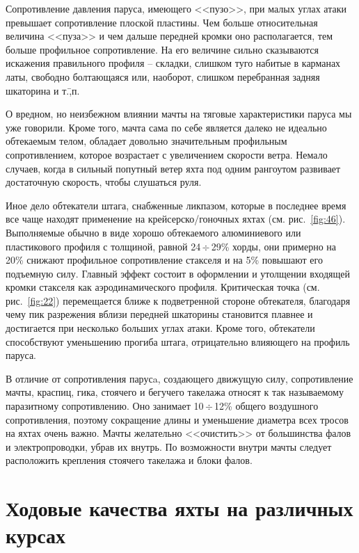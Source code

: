 \documentclass[a4paper, 12pt, twoside, final, book, russian, fittopage, cyremdash]{ncc}
\newcommand{\otdo}{\,\ensuremath{\div}\,}
\newcommand{\ris}[1]{\ref{fig:#1}}
\begin{document}
Сопротивление давления паруса, имеющего <<пузо>>, при малых углах атаки превышает сопротивление плоской пластины. Чем больше относительная величина <<пуза>> и чем дальше передней кромки оно располагается, тем больше профильное сопротивление. На его величине сильно сказываются искажения правильного профиля \--- складки, слишком туго набитые в карманах латы, свободно болтающаяся или, наоборот, слишком перебранная задняя шкаторина и т.\=,п.
 
О вредном, но неизбежном влиянии мачты на тяговые характеристики паруса мы уже говорили. Кроме того, мачта сама по себе является далеко не идеально обтекаемым телом, обладает довольно значительным профильным сопротивлением, которое возрастает с увеличением скорости ветра. Немало случаев, когда в сильный попутный ветер яхта под одним рангоутом развивает достаточную скорость, чтобы слушаться руля.

Иное дело обтекатели штага, снабженные ликпазом, которые в последнее время все чаще находят применение на крейсерско\-/гоночных яхтах (см. рис.~\ris{46}). Выполняемые обычно в виде хорошо обтекаемого алюминиевого или пластикового профиля с толщиной, равной 24\otdo 29\% хорды, они примерно на 20\% снижают профильное сопротивление стакселя и на 5\% повышают его подъемную силу. Главный эффект состоит в оформлении и утолщении входящей кромки стакселя как аэродинамического профиля. Критическая точка (см. рис.~\ris{22}) перемещается ближе к подветренной стороне обтекателя, благодаря чему пик разрежения вблизи передней шкаторины становится плавнее и достигается при несколько больших углах атаки. Кроме того, обтекатели способствуют уменьшению прогиба штага, отрицательно влияющего на профиль паруса.

В отличие от сопротивления парусa, создающего движущую силу, сопротивление мачты, краспиц, гика, стоячего и бегучего такелажа относят к так называемому паразитному сопротивлению. Оно занимает 10\otdo 12\% общего воздушного сопротивления, поэтому сокращение длины и уменьшение диаметра всех тросов на яхтах очень важно. Мачты желательно <<очистить>> от большинства фалов и электропроводки, убрав их внутрь. По возможности внутри мачты следует расположить крепления стоячего такелажа и блоки фалов.

\section{Ходовые качества яхты на различных курсах}
\end{document}
